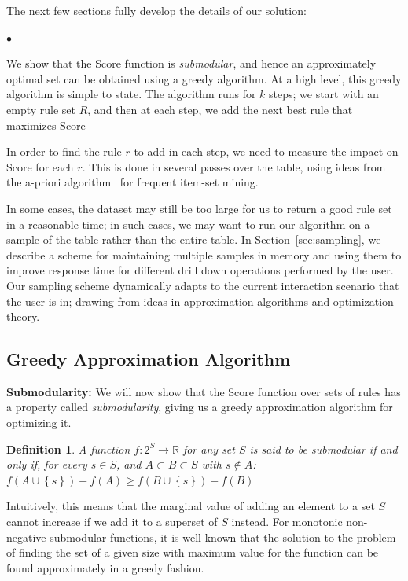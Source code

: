 \documentclass[10pt,journal,compsoc]{IEEEtran}
\newtheorem{definition}{Definition}
\newcounter{prob}
\newcommand{\squishlist}{
   \begin{list}{$\bullet$}
    { \setlength{\itemsep}{0pt}
      \setlength{\parsep}{2pt}
      \setlength{\topsep}{2pt}
      \setlength{\partopsep}{0pt}
    }
}
\newcommand{\stitle}[1]{\vspace{0.5em}\noindent\textbf{#1}}
\newcommand{\squishend}{\end{list}}
\begin{document}
The next few sections fully develop the
details of our solution:

\squishlist
\item We show that the Score function is {\em submodular}, and hence an approximately optimal set can be obtained using a greedy algorithm. At a high level, this greedy algorithm is simple to state. The algorithm runs for $k$ steps;
we start with an empty rule set $R$, and then at each step, we add the next best rule that maximizes Score
 
\item In order to find the rule $r$ to add in each step, we need to measure the impact on Score for each $r$. This is done in several passes over the table, using ideas from the a-priori algorithm~\cite{apriori} for frequent item-set mining. 
\squishend

In some cases, the dataset may still be too large for us to return a good rule set in
a reasonable time; in such cases, we may want to run our algorithm on a sample of the table
rather than the entire table. In Section~\ref{sec:sampling}, we describe a scheme 
for maintaining multiple samples in memory and using them to improve response 
time for different drill down operations performed by the user. Our sampling scheme dynamically adapts to the current interaction scenario that the user is in; drawing from ideas in approximation algorithms and optimization theory.

\subsection{Greedy Approximation Algorithm}\label{sec:greedy-approx}
\stitle{Submodularity:} We will now show that the Score function over sets of rules has a property called {\em submodularity}, giving us a greedy approximation algorithm for optimizing it. 
\begin{definition}
A function $f: 2^S \rightarrow \mathbb{R}$ for any set $S$ is said to be submodular if and only if, for every $s \in S$, and $A \subset B \subset S$ with $s \notin A$: $f(A \cup \left\lbrace s \right\rbrace) - f(A) \geq f(B \cup \left\lbrace s \right\rbrace) - f(B)$
\end{definition}
Intuitively, this means that the marginal value of adding an element to a set $S$ cannot increase if we add it to a superset of $S$ instead. For monotonic non-negative submodular functions, it is well known that the solution to the problem of finding the set of a given size with maximum value for the function can be found approximately in a greedy fashion. 
\end{document}
